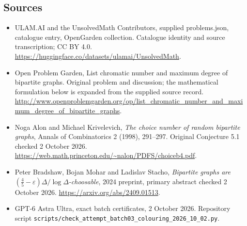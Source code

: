 \documentclass[11pt,a4paper]{article}
\begin{document}
\subsection{Sources}
\begin{itemize}
\item[S1] ULAM.AI and the UnsolvedMath Contributors, supplied problems.json, catalogue entry, OpenGarden collection. Catalogue identity and source transcription; CC BY 4.0.
\url{https://huggingface.co/datasets/ulamai/UnsolvedMath}.
\item[S2] Open Problem Garden, List chromatic number and maximum degree of bipartite graphs. Original problem and discussion; the mathematical formulation below is expanded from the supplied source record.
\url{http://www.openproblemgarden.org/op/list_chromatic_number_and_maximum_degree_of_bipartite_graphs}.

\item[R1] Noga Alon and Michael Krivelevich, \emph{The choice number
of random bipartite graphs}, Annals of Combinatorics 2 (1998), 291--297.
Original Conjecture 5.1 checked 2 October 2026.
\url{https://web.math.princeton.edu/~nalon/PDFS/choiceb4.pdf}.
\item[R2] Peter Bradshaw, Bojan Mohar and Ladislav Stacho,
\emph{Bipartite graphs are $(\frac45-\varepsilon)\Delta/\log\Delta$-choosable},
2024 preprint, primary abstract checked 2 October 2026.
\url{https://arxiv.org/abs/2409.01513}.
\item[R3] GPT-6 Astra Ultra, exact batch certificates, 2 October 2026.
Repository script \texttt{scripts/check\_attempt\_batch03\_colouring\_2026\_10\_02.py}.

\end{itemize}
\end{document}
